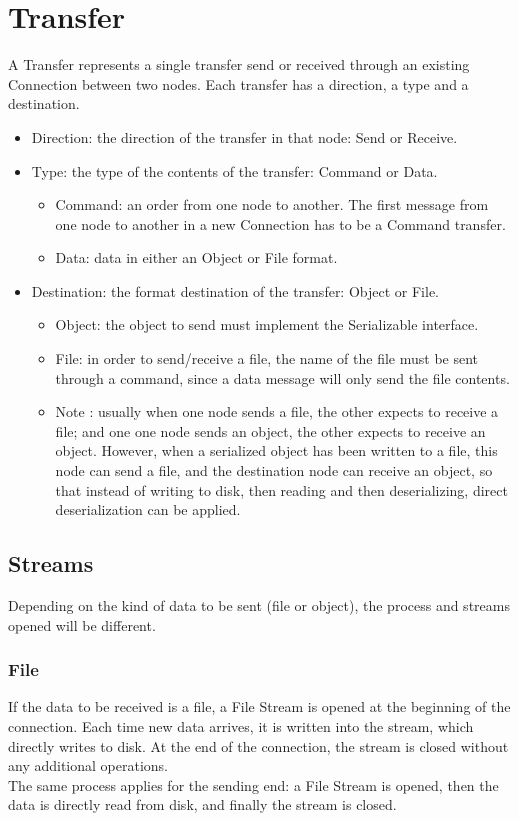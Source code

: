 \documentclass[11pt]{article}
\begin{document}
\section{Transfer}
	A Transfer represents a single transfer send or received through an existing Connection between two nodes. Each transfer has a direction, a type and a destination.
	\begin{itemize}
		\item Direction: the direction of the transfer in that node: Send or Receive.
		\item Type: the type of the contents of the transfer: Command or Data.
			\begin{itemize}
				\item Command: an order from one node to another. The first message from one node to another in a new Connection has to be a Command transfer.
				\item Data: data in either an Object or File format.
			\end{itemize}
		\item Destination: the format destination of the transfer: Object or File.
			\begin{itemize}
				\item Object: the object to send must implement the Serializable interface.
				\item File: in order to send/receive a file, the name of the file must be sent through a command, since a data message will only send the file contents.
				\item Note : usually when one node sends a file, the other expects to receive a file; and one one node sends an object, the other expects to receive an object. However, when a serialized object has been written to a file, this node can send a file, and the destination node can receive an object, so that instead of writing to disk, then reading and then deserializing, direct deserialization can be applied.
			\end{itemize}
	\end{itemize}
	\subsection{Streams}
	Depending on the kind of data to be sent (file or object), the process and streams opened will be different.
		\subsubsection{File}
			If the data to be received is a file, a File Stream is opened at the beginning of the connection. Each time new data arrives, it is written into the stream, which directly writes to disk. At the end of the connection, the stream is closed without any additional operations.\\ The same process applies for the sending end: a File Stream is opened, then the data is directly read from disk, and finally the stream is closed.
\end{document}
